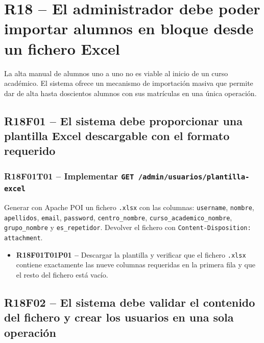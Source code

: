 \documentclass[12pt, a4paper]{report}
\begin{document}
\section{R18 -- El administrador debe poder importar alumnos en bloque desde un fichero Excel}

La alta manual de alumnos uno a uno no es viable al inicio de un curso académico. El sistema ofrece un mecanismo de importación masiva que permite dar de alta hasta doscientos alumnos con sus matrículas en una única operación.

\subsection{R18F01 -- El sistema debe proporcionar una plantilla Excel descargable con el formato requerido}

\subsubsection{R18F01T01 -- Implementar \texttt{GET /admin/usuarios/plantilla-excel}}
Generar con Apache POI un fichero \texttt{.xlsx} con las columnas: \texttt{username}, \texttt{nombre}, \texttt{apellidos}, \texttt{email}, \texttt{password}, \texttt{centro\_nombre}, \texttt{curso\_academico\_nombre}, \texttt{grupo\_nombre} y \texttt{es\_repetidor}. Devolver el fichero con \texttt{Content-Disposition: attachment}.
\begin{itemize}
  \item \textbf{R18F01T01P01 --} Descargar la plantilla y verificar que el fichero \texttt{.xlsx} contiene exactamente las nueve columnas requeridas en la primera fila y que el resto del fichero está vacío.
\end{itemize}

\subsection{R18F02 -- El sistema debe validar el contenido del fichero y crear los usuarios en una sola operación}
\end{document}
